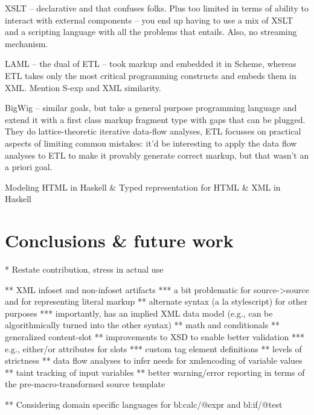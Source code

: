 \documentclass{www2003-submission}
\begin{document}
XSLT -- declarative and that confuses folks.  Plus too limited in
terms of ability to interact with external components -- you end up
having to use a mix of XSLT and a scripting language with all the
problems that entails.  Also, no streaming mechanism.

LAML -- the dual of ETL -- took markup and embedded it in Scheme,
whereas ETL takes only the most critical programming constructs and
embeds them in XML.  Mention S-exp and XML similarity.

BigWig -- similar goals, but take a general purpose programming
language and extend it with a first class markup fragment type with
gaps that can be plugged.  They do lattice-theoretic iterative
data-flow analyses, ETL focusses on practical aspects of limiting
common mistakes:  it'd be interesting to apply the data flow analyses
to ETL to make it provably generate correct markup, but that wasn't an
a priori goal.

Modeling HTML in Haskell \& Typed representation for HTML \& XML in Haskell


\section{Conclusions \& future work}
\label{sec-conclusion}

* Restate contribution, stress in actual use


** XML infoset and non-infoset artifacts
*** a bit problematic for source->source and for representing literal markup
** alternate syntax (a la stylescript) for other purposes
*** importantly, has an implied XML data model (e.g., can be algorithmically turned into the other syntax)
** math and conditionals
** generalized content-slot
** improvements to XSD to enable better validation
*** e.g., either/or attributes for slots
*** custom tag element definitions
** levels of strictness
** data flow analyses to infer needs for xmlencoding of variable values
** taint tracking of input variables
** better warning/error reporting in terms of the pre-macro-transformed source template

** Considering domain specific languages for bl:calc/@expr and bl:if/@test
\end{document}
